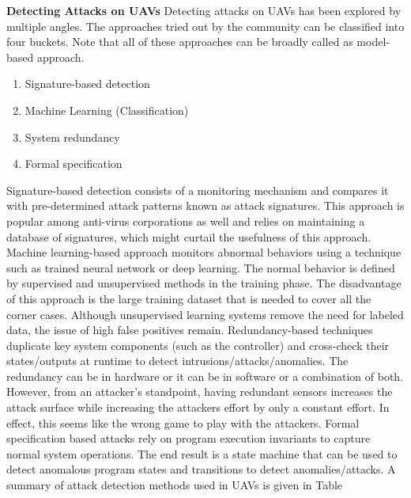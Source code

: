 \textbf{Detecting Attacks on UAVs} Detecting attacks on UAVs has been explored by multiple angles. The approaches tried out by the community can be classified into four buckets. Note that all of these approaches can be broadly called as model-based approach.

\begin{enumerate}
	\item Signature-based detection
	\item Machine Learning (Classification)
	\item System redundancy
	\item Formal specification
\end{enumerate} 
 
Signature-based detection consists of a monitoring mechanism and compares it with pre-determined attack patterns known as attack signatures. This approach is popular among anti-virus corporations as well and relies on maintaining a database of signatures, which might curtail the usefulness of this approach. Machine learning-based approach monitors abnormal behaviors using a technique such as trained neural network or deep learning. The normal behavior is defined by supervised and unsupervised methods in the training phase. The disadvantage of this approach is the large training dataset that is needed to cover all the corner cases. Although unsupervised learning systems remove the need for labeled data, the issue of high false positives remain. Redundancy-based techniques duplicate key system components (such as the controller) and cross-check their states/outputs at runtime to detect intrusions/attacks/anomalies. The redundancy can be in hardware or it can be in software or a combination of both. However, from an attacker's standpoint, having redundant sensors increases the attack surface while increasing the attackers effort by only a constant effort. In effect, this seems like the wrong game to play with the attackers. Formal specification based attacks rely on program execution invariants to capture normal system operations. The end result is a state machine that can be used to detect anomalous program states and transitions to detect anomalies/attacks. A summary of attack detection methods used in UAVs is given in Table \cite{}  





